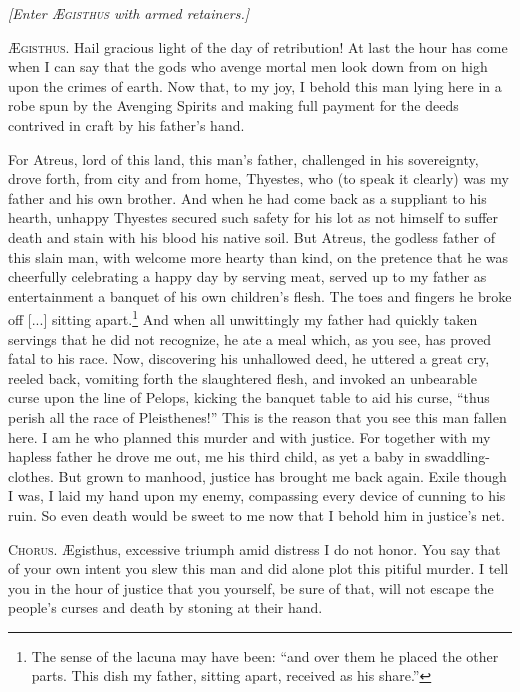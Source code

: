 \documentclass[12pt]{article}
\begin{document}
\begin{center}
\textit{[Enter \textsc{{\AE}gisthus} with armed retainers.]}
\end{center}

\textsc{{\AE}gisthus.} Hail gracious light of the day of retribution! At last the hour has come when I can say that the gods who avenge mortal men look down from on high upon the crimes of earth. Now that, to my joy, I behold this man lying here in a robe spun by the Avenging Spirits and making full payment for the deeds contrived in craft by his father's hand.

For Atreus, lord of this land, this man's father, challenged in his sovereignty, drove forth, from city and from home, Thyestes, who (to speak it clearly) was my father and his own brother. And when he had come back as a suppliant to his hearth, unhappy Thyestes secured such safety for his lot as not himself to suffer death and stain with his blood his native soil. But Atreus, the godless father of this slain man, with welcome more hearty than kind, on the pretence that he was cheerfully celebrating a happy day by serving meat, served up to my father as entertainment a banquet of his own children's flesh. The toes and fingers he broke off [...] sitting apart.\footnote{The sense of the lacuna may have been: ``and over them he placed the other parts. This dish my father, sitting apart, received as his share.''} And when all unwittingly my father had quickly taken servings that he did not recognize, he ate a meal which, as you see, has proved fatal to his race. Now, discovering his unhallowed deed, he uttered a great cry, reeled back, vomiting forth the slaughtered flesh, and invoked an unbearable curse upon the line of Pelops, kicking the banquet table to aid his curse, ``thus perish all the race of Pleisthenes!'' This is the reason that you see this man fallen here. I am he who planned this murder and with justice. For together with my hapless father he drove me out, me his third child, as yet a baby in swaddling-clothes. But grown to manhood, justice has brought me back again. Exile though I was, I laid my hand upon my enemy, compassing every device of cunning to his ruin. So even death would be sweet to me now that I behold him in justice's net.

\textsc{Chorus.} {\AE}gisthus, excessive triumph amid distress I do not honor. You say that of your own intent you slew this man and did alone plot this pitiful murder. I tell you in the hour of justice that you yourself, be sure of that, will not escape the people's curses and death by stoning at their hand.
\end{document}
